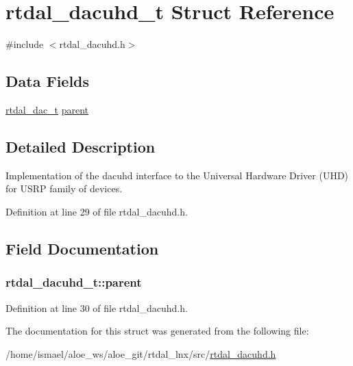 \hypertarget{structrtdal__dacuhd__t}{\section{rtdal\-\_\-dacuhd\-\_\-t Struct Reference}
\label{structrtdal__dacuhd__t}
}


{\ttfamily \#include $<$rtdal\-\_\-dacuhd.\-h$>$}

\subsection*{Data Fields}
\begin{DoxyCompactItemize}
\item 
\hyperlink{structrtdal__dac__t}{rtdal\-\_\-dac\-\_\-t} \hyperlink{structrtdal__dacuhd__t_aec26b87f7f7c6ef85c415a4b0aa23027}{parent}
\end{DoxyCompactItemize}


\subsection{Detailed Description}
Implementation of the dacuhd interface to the Universal Hardware Driver (U\-H\-D) for U\-S\-R\-P family of devices. 

Definition at line 29 of file rtdal\-\_\-dacuhd.\-h.



\subsection{Field Documentation}
\hypertarget{structrtdal__dacuhd__t_aec26b87f7f7c6ef85c415a4b0aa23027}{
\subsubsection[{parent}]{ rtdal\-\_\-dacuhd\-\_\-t\-::parent}}\label{structrtdal__dacuhd__t_aec26b87f7f7c6ef85c415a4b0aa23027}


Definition at line 30 of file rtdal\-\_\-dacuhd.\-h.



The documentation for this struct was generated from the following file\-:\begin{DoxyCompactItemize}
\item 
/home/ismael/aloe\-\_\-ws/aloe\-\_\-git/rtdal\-\_\-lnx/src/\hyperlink{rtdal__dacuhd_8h}{rtdal\-\_\-dacuhd.\-h}\end{DoxyCompactItemize}
